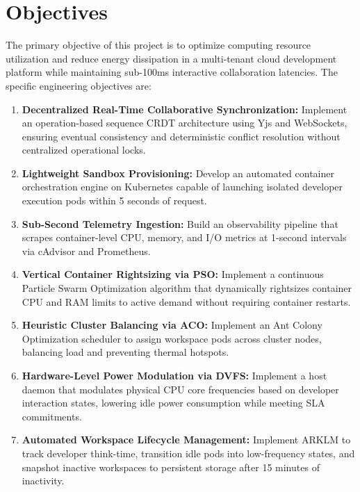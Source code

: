 \documentclass[12pt,a4paper]{report}
\begin{document}
\section{Objectives}
The primary objective of this project is to optimize computing resource utilization and reduce energy dissipation in a multi-tenant cloud development platform while maintaining sub-100ms interactive collaboration latencies. The specific engineering objectives are:
\begin{enumerate}
    \item \textbf{Decentralized Real-Time Collaborative Synchronization:} Implement an operation-based sequence CRDT architecture using Yjs and WebSockets, ensuring eventual consistency and deterministic conflict resolution without centralized operational locks.
    \item \textbf{Lightweight Sandbox Provisioning:} Develop an automated container orchestration engine on Kubernetes capable of launching isolated developer execution pods within 5 seconds of request.
    \item \textbf{Sub-Second Telemetry Ingestion:} Build an observability pipeline that scrapes container-level CPU, memory, and I/O metrics at 1-second intervals via cAdvisor and Prometheus.
    \item \textbf{Vertical Container Rightsizing via PSO:} Implement a continuous Particle Swarm Optimization algorithm that dynamically rightsizes container CPU and RAM limits to active demand without requiring container restarts.
    \item \textbf{Heuristic Cluster Balancing via ACO:} Implement an Ant Colony Optimization scheduler to assign workspace pods across cluster nodes, balancing load and preventing thermal hotspots.
    \item \textbf{Hardware-Level Power Modulation via DVFS:} Implement a host daemon that modulates physical CPU core frequencies based on developer interaction states, lowering idle power consumption while meeting SLA commitments.
    \item \textbf{Automated Workspace Lifecycle Management:} Implement ARKLM to track developer think-time, transition idle pods into low-frequency states, and snapshot inactive workspaces to persistent storage after 15 minutes of inactivity.
\end{enumerate}
\end{document}
